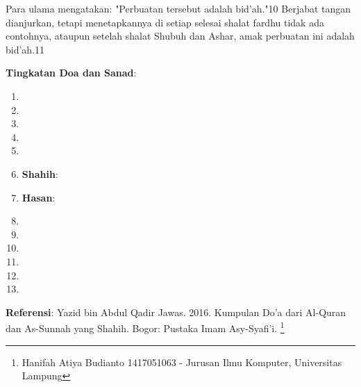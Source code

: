 \documentclass[a4paper,12pt]{article}
\begin{document}
\begin{enumerate}
\par
\indent
Para ulama mengatakan: "Perbuatan tersebut adalah bid'ah."10
\indent
Berjabat tangan dianjurkan, tetapi menetapkannya di setiap selesai shalat fardhu tidak ada contohnya, ataupun setelah shalat Shubuh dan Ashar, amak perbuatan ini adalah bid'ah.11\\
\end{enumerate}
\par
\noindent
\textbf{Tingkatan Doa dan Sanad}:
\begin{enumerate}
\item 
\item 
\item 
\item 
\item 
\item \textbf{Shahih}: 
\item \textbf{Hasan}: 
\item 
\item 
\item 
\item 
\item 
\item 
\end{enumerate}
\textbf{Referensi}: Yazid bin Abdul Qadir Jawas. 2016. Kumpulan Do'a dari
Al-Quran dan As-Sunnah yang Shahih. Bogor: Pustaka Imam Asy-Syafi'i.
\footnote{Hanifah Atiya Budianto 1417051063 - Jurusan Ilmu Komputer,
Universitas Lampung}
\end{document}
